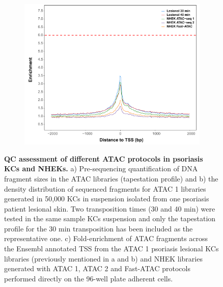 \begin{figure}[htbp]
\begin{subfigure}{0.45\textwidth}
\includegraphics[width=\textwidth]{./Results1/pdfs/ATAC_skin_TSS_enrichment_PS02_30_40min_NHEK_ATAC1_ATAC_2_FAST_ATAC}
\caption{\textbf{}} %
\end{subfigure}
\caption[QC assessment of different ATAC protocols in psoriasis KCs and NHEKs.]{\textbf{QC assessment of different ATAC protocols in psoriasis KCs and NHEKs.} a) Pre-sequencing quantification of DNA fragment sizes in the ATAC libraries (tapestation profile) and b) the density distribution of sequenced fragments for ATAC 1 libraries generated in 50,000 KCs in suspension isolated from one psoriasis patient lesional skin. Two transposition times (30 and 40 min) were tested in the same sample KCs suspension and only the tapestation profile for the 30 min transposition has been included as the representative one. c) Fold-enrichment of ATAC fragments across the Ensembl annotated TSS from the ATAC 1 psoriasis lesional KCs libraries (previously mentioned in a and b) and NHEK libraries generated with ATAC 1, ATAC 2 and Fast-ATAC protocols performed directly on the 96-well plate adherent cells.}
\label{figure:PS02_skin_ATAC_QC_assessment}
\end{figure} 


